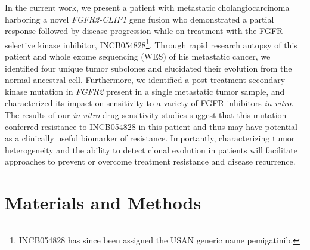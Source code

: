 In the current work, we present a patient with metastatic cholangiocarcinoma harboring a novel \textit{FGFR2-CLIP1} gene fusion who demonstrated a partial response followed by disease progression while on treatment with the FGFR-selective kinase inhibitor, INCB054828\footnote{INCB054828 has since been assigned the USAN generic name pemigatinib.}. Through rapid research autopsy of this patient and whole exome sequencing (WES) of his metastatic cancer, we identified four unique tumor subclones and elucidated their evolution from the normal ancestral cell. Furthermore, we identified a post-treatment secondary kinase mutation in \textit{FGFR2} present in a single metastatic tumor sample, and characterized its impact on sensitivity to a variety of FGFR inhibitors \textit{in vitro}. The results of our \textit{in vitro} drug sensitivity studies suggest that this mutation conferred resistance to INCB054828 in this patient and thus may have potential as a clinically useful biomarker of resistance. Importantly, characterizing tumor heterogeneity and the ability to detect clonal evolution in patients will facilitate approaches to prevent or overcome treatment resistance and disease recurrence.

\section{Materials and Methods}
\label{sec:240:methods}
